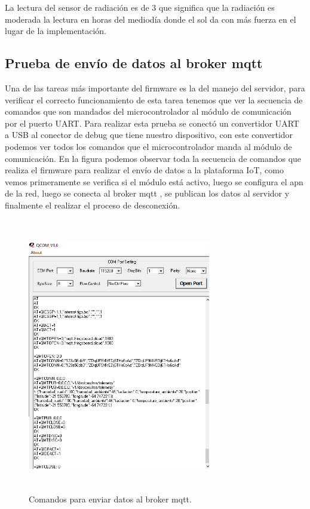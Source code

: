 La lectura del sensor de radiación es de 3 que significa que la radiación es moderada la lectura en horas del mediodía donde el sol da con más fuerza en el lugar de la implementación.


\subsection{Prueba de envío de datos al broker mqtt}
Una de las tareas más importante del firmware es la del manejo del servidor, para verificar el correcto funcionamiento de esta tarea tenemos que ver la secuencia de comandos que son mandados del microcontrolador al módulo de comunicación por el puerto UART.
Para realizar esta prueba se conectó un convertidor UART a USB al conector de debug que tiene nuestro dispositivo, con este convertidor podemos ver todos los comandos que el microcontrolador manda al módulo de comunicación.
En la figura podemos observar toda la secuencia de comandos que realiza el firmware para realizar el envío de datos a la plataforma IoT, como vemos  primeramente se verifica si el módulo está activo, luego se configura el apn de la red, luego se conecta al broker mqtt , se publican  los datos al servidor y finalmente el realizar el proceso de desconexión.

\begin{figure}[h]
  \centering
    \includegraphics[width=8cm, height=12cm]{./Figures/Qcom_enviodedatos.png}
  \caption{Comandos para enviar datos al broker mqtt.}
    \label{fig:conexion broker}
\end{figure}

